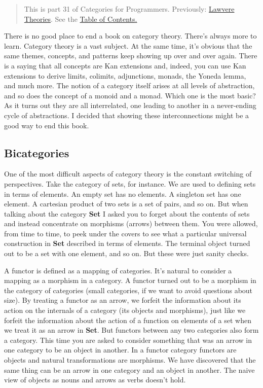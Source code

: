 \begin{quote}
This is part 31 of Categories for Programmers. Previously:
\href{https://bartoszmilewski.com/2017/08/26/lawvere-theories/}{Lawvere
Theories}. See the
\href{https://bartoszmilewski.com/2014/10/28/category-theory-for-programmers-the-preface/}{Table
of Contents}\href{https://bartoszmilewski.com/2017/07/22/topoi/}{.}
\end{quote}

There is no good place to end a book on category theory. There's always
more to learn. Category theory is a vast subject. At the same time, it's
obvious that the same themes, concepts, and patterns keep showing up
over and over again. There is a saying that all concepts are Kan
extensions and, indeed, you can use Kan extensions to derive limits,
colimits, adjunctions, monads, the Yoneda lemma, and much more. The
notion of a category itself arises at all levels of abstraction, and so
does the concept of a monoid and a monad. Which one is the most basic?
As it turns out they are all interrelated, one leading to another in a
never-ending cycle of abstractions. I decided that showing these
interconnections might be a good way to end this book.

\subsection{Bicategories}\label{bicategories}

One of the most difficult aspects of category theory is the constant
switching of perspectives. Take the category of sets, for instance. We
are used to defining sets in terms of elements. An empty set has no
elements. A singleton set has one element. A cartesian product of two
sets is a set of pairs, and so on. But when talking about the category
\textbf{Set} I asked you to forget about the contents of sets and
instead concentrate on morphisms (arrows) between them. You were
allowed, from time to time, to peek under the covers to see what a
particular universal construction in \textbf{Set} described in terms of
elements. The terminal object turned out to be a set with one element,
and so on. But these were just sanity checks.

A functor is defined as a mapping of categories. It's natural to
consider a mapping as a morphism in a category. A functor turned out to
be a morphism in the category of categories (small categories, if we
want to avoid questions about size). By treating a functor as an arrow,
we forfeit the information about its action on the internals of a
category (its objects and morphisms), just like we forfeit the
information about the action of a function on elements of a set when we
treat it as an arrow in \textbf{Set}. But functors between any two
categories also form a category. This time you are asked to consider
something that was an arrow in one category to be an object in another.
In a functor category functors are objects and natural transformations
are morphisms. We have discovered that the same thing can be an arrow in
one category and an object in another. The naive view of objects as
nouns and arrows as verbs doesn't hold.

